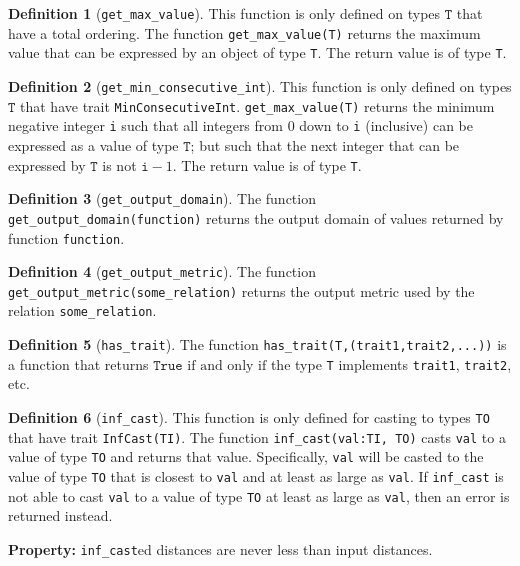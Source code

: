\documentclass[11pt,a4paper]{article}
\theoremstyle{definition}
\newtheorem{definition}{Definition}[section]
\newcommand{\True}{\texttt{True}}
\newcommand{\T}{\texttt{T}}
\newcommand{\iffText}{\text{if and only if}}
\begin{document}
\begin{definition}[\texttt{get\_max\_value}]
    This function is only defined on types $\T$ that have a total ordering. The function \texttt{get\_max\_value(T)} returns the maximum value that can be expressed by an object of type \texttt{T}. The return value is of type \texttt{T}.
\end{definition}

\begin{definition}[\texttt{get\_min\_consecutive\_int}]
    This function is only defined on types $\T$ that have trait \texttt{MinConsecutiveInt}.   \texttt{get\_max\_value(T)} returns the minimum negative integer \texttt{i} such that all integers from 0 down to \texttt{i} (inclusive) can be expressed as a value of type $\T$; but such that the next integer that can be expressed by $\T$ is not $\texttt{i}-1$. The return value is of type \texttt{T}.
\end{definition}

\begin{definition}[\texttt{get\_output\_domain}]
    The function \texttt{get\_output\_domain(function)} returns the output domain of values returned by function \texttt{function}.
\end{definition}

\begin{definition}[\texttt{get\_output\_metric}]
    The function \texttt{get\_output\_metric(some\_relation)} returns the output metric used by the relation \texttt{some\_relation}.
\end{definition}

\begin{definition}[\texttt{has\_trait}]
    The function \texttt{has\_trait(T,(trait1,trait2,...))} is a function that returns $\True$ $\iffText$ the type \texttt{T} implements \texttt{trait1}, \texttt{trait2}, etc.
\end{definition}

\begin{definition}[\texttt{inf\_cast}]
    This function is only defined for casting to types \texttt{TO} that have trait \texttt{InfCast(TI)}. The function \texttt{inf\_cast(val:TI, TO)} casts \texttt{val} to a value of type \texttt{TO} and returns that value. Specifically, \texttt{val} will be casted to the value of type \texttt{TO} that is closest to \texttt{val} and at least as large as \texttt{val}. If \texttt{inf\_cast} is not able to cast \texttt{val} to a value of type \texttt{TO} at least as large as \texttt{val}, then an error is returned instead.
    
    \textbf{Property:} \texttt{inf\_cast}ed distances are never less than input distances.
\end{definition}
\end{document}
